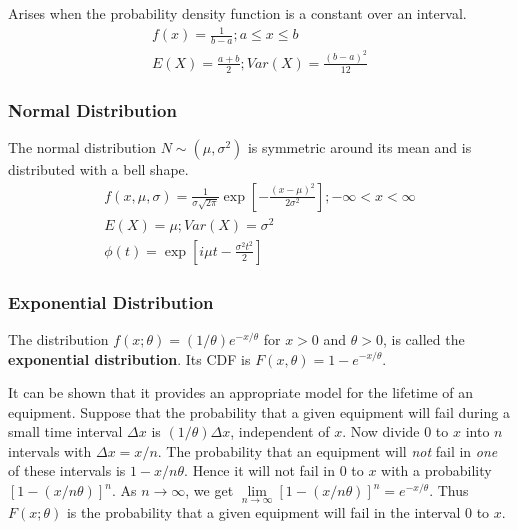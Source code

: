 \documentclass{article}
\begin{document}
Arises when the probability density function is a constant over an interval.
\begin{equation*}
\begin{split}
    f(x)=\frac{1}{b-a}; a \leq x \leq b \\
    E(X)=\frac{a+b}{2}; Var(X)=\frac{(b-a)^2}{12}
\end{split}
\end{equation*}

\subsubsection{Normal Distribution}

The normal distribution \(N \sim (\mu, \sigma^2)\) is symmetric around its mean and is distributed with a bell shape. 
\begin{equation*}
    \begin{split}
        f(x, \mu, \sigma) = \frac{1}{\sigma\sqrt{2 \pi}} \exp\left[-\frac{(x-\mu)^2}{2\sigma^2}\right]; -\infty < x < \infty \\
        E(X) = \mu; Var(X)=\sigma^2 \\
        \phi(t)=\exp[i\mu t-\frac{\sigma^2t^2}{2}]
    \end{split}
\end{equation*}


\subsubsection{Exponential Distribution}

The distribution \(f(x;\theta)=(1/\theta)e^{-x/\theta}\) for \(x>0\) and \(\theta>0\), is called the \textbf{exponential distribution}. Its CDF is \(F(x,\theta)=1-e^{-x/\theta}\).

It can be shown that it provides an appropriate model for the lifetime of an equipment. Suppose that the probability that a given equipment will fail during a small time interval \(\Delta x\) is \((1/\theta)\Delta x\), independent of \(x\). Now divide 0 to \(x\) into \(n\) intervals with \(\Delta x=x/n\). The probability that an equipment will \emph{not} fail in \emph{one} of these intervals is \(1-x/n\theta\). Hence it will not fail in 0 to \(x\) with a probability \([1-(x/n\theta)]^n\). As \(n \rightarrow \infty\), we get \(\lim\limits_{n \rightarrow \infty} [1-(x/n\theta)]^n=e^{-x/\theta}\). Thus \(F(x;\theta)\) is the probability that a given equipment will fail in the interval 0 to \(x\).
\end{document}
